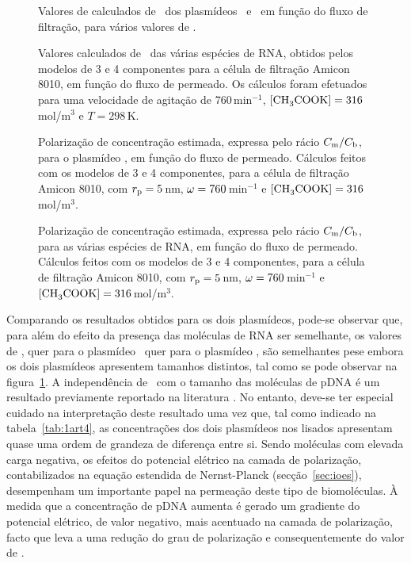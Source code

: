 \begin{figure}
	\centering
	
	\caption[Valores de calculados de \permobs\ dos plasmídeos \pVAX\ e \pCAMBIA]{Valores de calculados de \permobs\ dos plasmídeos \pVAX\ e \pCAMBIA\ em função do fluxo de filtração, para vários valores de \raioporo.}
	\label{fig:1dart4}
\end{figure}
\begin{figure}
	\centering
	
	\caption[Valores calculados de \permobs\ das várias espécies de RNA]{Valores calculados de \permobs\ das várias espécies de RNA, obtidos pelos modelos de 3 e 4 componentes para a célula de filtração Amicon 8010, em função do fluxo de permeado. Os cálculos foram efetuados para uma velocidade de agitação de 760\,min$^{-1}$, $[\ce{CH3COOK}]=316$\,mol/m$^{3}$ e $T=298$\,K.}
	\label{fig:2art4}
\end{figure}
\begin{figure}
	\centering
	
	\caption[Polarização de concentração estimada para o plasmídeo \pVAX]{Polarização de concentração estimada, expressa pelo rácio $C_{\mathrm{m}}/C_{\mathrm{b}}$, para o plasmídeo \pVAX, em função do fluxo de permeado. Cálculos feitos com os modelos de 3 e 4 componentes, para a célula de filtração Amicon 8010, com $r_{\mathrm{p}}=5$\,nm, $\omega=760$\,min$^{-1}$ e $[\ce{CH3COOK}]=316$\,mol/m$^{3}$.}
	\label{fig:3aart4}
\end{figure}
\begin{figure}
	\centering
	
	\caption[Polarização de concentração estimada para as várias espécies de RNA]{Polarização de concentração estimada, expressa pelo rácio $C_{\mathrm{m}}/C_{\mathrm{b}}$, para as várias espécies de RNA, em função do fluxo de permeado. Cálculos feitos com os modelos de 3 e 4 componentes, para a célula de filtração Amicon 8010, com $r_{\mathrm{p}}=5$\,nm, $\omega=760$\,min$^{-1}$ e $[\ce{CH3COOK}]=316$\,mol/m$^{3}$.}
	\label{fig:3bcdart4}
\end{figure}

Comparando os resultados obtidos para os dois plasmídeos, pode-se observar que, para além do efeito da presença das moléculas de RNA ser semelhante, os valores de \permobs, quer para o plasmídeo \pVAX\ quer para o plasmídeo \pCAMBIA, são semelhantes pese embora os dois plasmídeos apresentem tamanhos distintos, tal como se pode observar na figura~\ref{fig:1dart4}. A independência de \permobs\ com o tamanho das moléculas de pDNA é um resultado previamente reportado na literatura \cite{latu07,latusalt,latu09}. No entanto, deve-se ter especial cuidado na interpretação deste resultado uma vez que, tal como indicado na tabela~\ref{tab:1art4}, as concentrações dos dois plasmídeos nos lisados apresentam quase uma ordem de grandeza de diferença entre si. Sendo moléculas com elevada carga negativa, os efeitos do potencial elétrico na camada de polarização, contabilizados na equação estendida de Nernst-Planck (secção~\ref{sec:ioes}), desempenham um importante papel na permeação deste tipo de biomoléculas. À medida que a concentração de pDNA aumenta é gerado um gradiente do potencial elétrico, de valor negativo, mais acentuado na camada de polarização, facto que leva a uma redução do grau de polarização e consequentemente do valor de \permobs.   

